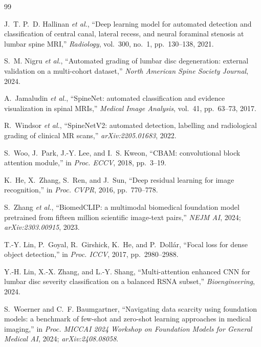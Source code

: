 \documentclass[runningheads]{llncs}
\begin{document}
\begin{thebibliography}{99}
\footnotesize
\setlength{\itemsep}{1pt}

J.~T. P.~D. Hallinan \textit{et al.},
``Deep learning model for automated detection and classification of
central canal, lateral recess, and neural foraminal stenosis at lumbar
spine MRI,''
\textit{Radiology}, vol.~300, no.~1, pp.~130--138, 2021.

S.~M. Nigru \textit{et al.},
``Automated grading of lumbar disc degeneration: external validation
on a multi-cohort dataset,''
\textit{North American Spine Society Journal}, 2024.

A.~Jamaludin \textit{et al.},
``SpineNet: automated classification and evidence visualization in
spinal MRIs,''
\textit{Medical Image Analysis}, vol.~41, pp.~63--73, 2017.

R.~Windsor \textit{et al.},
``SpineNetV2: automated detection, labelling and radiological grading
of clinical MR scans,''
\textit{arXiv:2205.01683}, 2022.

S.~Woo, J.~Park, J.-Y. Lee, and I.~S. Kweon,
``CBAM: convolutional block attention module,''
in \textit{Proc. ECCV}, 2018, pp.~3--19.

K.~He, X.~Zhang, S.~Ren, and J.~Sun,
``Deep residual learning for image recognition,''
in \textit{Proc. CVPR}, 2016, pp.~770--778.

S.~Zhang \textit{et al.},
``BiomedCLIP: a multimodal biomedical foundation model pretrained from
fifteen million scientific image-text pairs,''
\textit{NEJM AI}, 2024;\newline
\textit{arXiv:2303.00915}, 2023.

T.-Y. Lin, P.~Goyal, R.~Girshick, K.~He, and P.~Doll\'ar,
``Focal loss for dense object detection,''
in \textit{Proc. ICCV}, 2017, pp.~2980--2988.

Y.-H. Lin, X.-X. Zhang, and L.-Y. Shang,
``Multi-attention enhanced CNN for lumbar disc severity classification
on a balanced RSNA subset,''
\textit{Bioengineering}, 2024.

S.~Woerner and C.~F. Baumgartner,
``Navigating data scarcity using foundation models: a benchmark of
few-shot and zero-shot learning approaches in medical imaging,''
in \textit{Proc. MICCAI 2024 Workshop on Foundation Models for
General Medical AI}, 2024;\newline
\textit{arXiv:2408.08058}.


\end{thebibliography}
\end{document}
